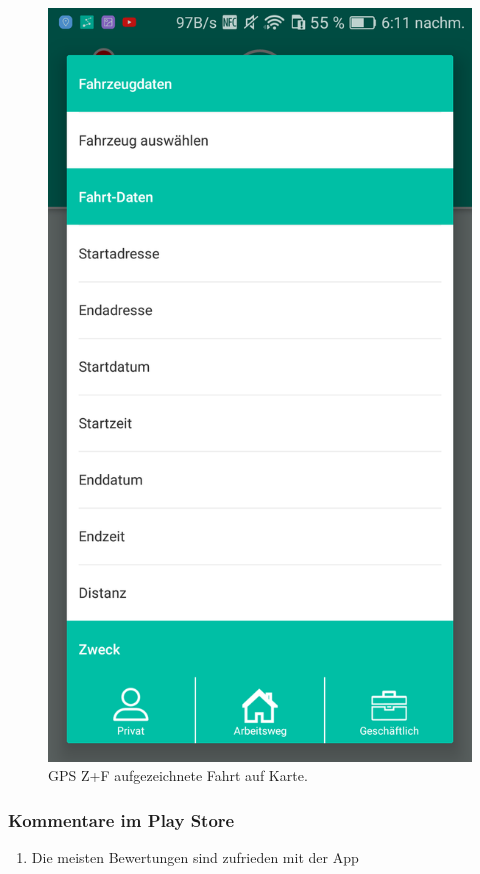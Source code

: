 \begin{figure}[H]
\begin{minipage}[b]{.4\linewidth}
        \includegraphics[scale=0.14]{img/squ4}
        \caption{\label{img:img/squ4}GPS Z+F aufgezeichnete Fahrt auf Karte.}
    \end{minipage}
\end{figure}

\subsubsection{Kommentare im Play Store}
\begin{enumerate}
    \item Die meisten Bewertungen sind zufrieden mit der App
\end{enumerate}

